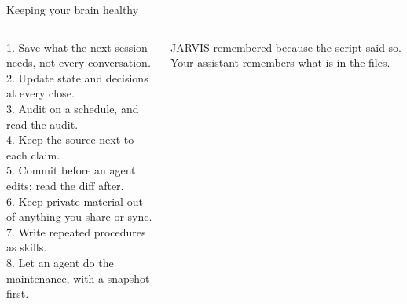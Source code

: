 \begin{frame}{Keeping your brain healthy}
  \begin{columns}[T,onlytextwidth]
      {\small
      1. Save what the next session needs, not every conversation.\\[0.28em]
      2. Update state and decisions at every close.\\[0.28em]
      3. Audit on a schedule, and read the audit.\\[0.28em]
      4. Keep the source next to each claim.\\[0.28em]
      5. Commit before an agent edits; read the diff after.\\[0.28em]
      6. Keep private material out of anything you share or sync.\\[0.28em]
      7. Write repeated procedures as skills.\\[0.28em]
      8. Let an agent do the maintenance, with a snapshot first.\par}
      {\small\color{muted} JARVIS remembered because the script said so. Your assistant remembers what is in the files.\par}
  \end{columns}
\end{frame}
